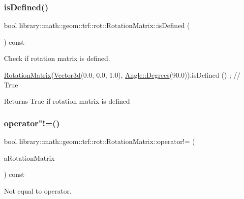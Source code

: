 \subsubsection{\texorpdfstring{is\+Defined()}{isDefined()}}
{\footnotesize\ttfamily bool library\+::math\+::geom\+::trf\+::rot\+::\+Rotation\+Matrix\+::is\+Defined (\begin{DoxyParamCaption}{ }\end{DoxyParamCaption}) const}



Check if rotation matrix is defined. 


\begin{DoxyCode}
\hyperlink{classlibrary_1_1math_1_1geom_1_1trf_1_1rot_1_1_rotation_matrix_a667d2c05aa5b0cc88775938d11164cdc}{RotationMatrix}(\hyperlink{namespacelibrary_1_1math_1_1obj_a977e84e9bf317a4e7dd9d6d671d6da2f}{Vector3d}(0.0, 0.0, 1.0), \hyperlink{classlibrary_1_1math_1_1geom_1_1_angle_a64aa53e8420aeb6f671d86c65c370bc8}{Angle::Degrees}(90.0)).isDefined
      () ; \textcolor{comment}{// True}
\end{DoxyCode}


\begin{DoxyReturn}{Returns}
True if rotation matrix is defined 
\end{DoxyReturn}
\mbox{\label{classlibrary_1_1math_1_1geom_1_1trf_1_1rot_1_1_rotation_matrix_a28996f6b0def32867b58931e1c804b4f}} 
\subsubsection{\texorpdfstring{operator"!=()}{operator!=()}}
{\footnotesize\ttfamily bool library\+::math\+::geom\+::trf\+::rot\+::\+Rotation\+Matrix\+::operator!= (\begin{DoxyParamCaption}\item[{const \hyperlink{classlibrary_1_1math_1_1geom_1_1trf_1_1rot_1_1_rotation_matrix}{Rotation\+Matrix} \&}]{a\+Rotation\+Matrix }\end{DoxyParamCaption}) const}



Not equal to operator. 


